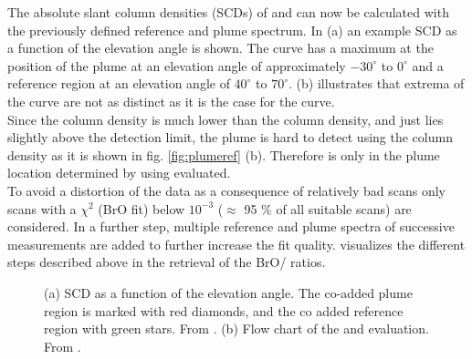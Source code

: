 The absolute slant column densities (SCDs) of   and  can now be calculated with the previously defined reference and plume spectrum.
In  (a) an example  SCD as a function of the elevation angle is shown. The  curve has a maximum at the position of the plume at an elevation angle of approximately $-30^{\circ}$ to $0^{\circ}$  and a reference region at an elevation angle of $40^{\circ}$ to $70^{\circ}$.  (b)  illustrates that  extrema of the   curve are not as distinct as it is the case for the  curve.\\
Since the  column density is much lower than the  column density, and just lies slightly above the detection limit, the plume is hard to detect using the  column density as it is shown in fig. \ref{fig:plumeref} (b). 
Therefore   is only in the plume location determined by using  evaluated.\\
To avoid a distortion of the data as a consequence of relatively bad scans only scans with a $\chi^2$ (BrO fit) below $10^{-3}$ ($\approx$    95 \% of all suitable scans) are considered.
In a further step, multiple reference and plume spectra of successive measurements are added to further increase the fit quality.
 visualizes the different steps described above in the retrieval of the BrO/ ratios.\\
\begin{figure}
	\caption{(a)  SCD as a function of the elevation angle. The co-added plume region is marked with red diamonds, and the co added reference region with green stars. From \cite{WarnachSimon}. (b) Flow chart of the   and  evaluation. From \cite{lubcke2014optical}.}
	\label{fig:algorithm}
\end{figure}

